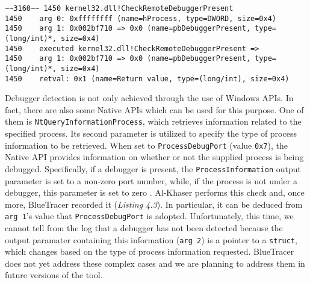 \vspace{0.5cm}
\begin{lstlisting}[caption={Log entry relative to \texttt{CheckRemoteDebuggerPresent}},captionpos=b]
~~3160~~ 1450 kernel32.dll!CheckRemoteDebuggerPresent
1450 	arg 0: 0xffffffff (name=hProcess, type=DWORD, size=0x4)
1450 	arg 1: 0x002bf710 => 0x0 (name=pbDebuggerPresent, type=(long/int)*, size=0x4)
1450    executed kernel32.dll!CheckRemoteDebuggerPresent =>
1450 	arg 1: 0x002bf710 => 0x0 (name=pbDebuggerPresent, type=(long/int)*, size=0x4)
1450 	retval: 0x1 (name=Return value, type=(long/int), size=0x4)
\end{lstlisting}

Debugger detection is not only achieved through the use of Windows APIs. In fact, there are also some Native APIs which can be used for this purpose. One of them is \texttt{NtQueryInformationProcess}, which retrieves information related to the specified process. Its second parameter is utilized to specify the type of process information to be retrieved. When set to \texttt{ProcessDebugPort} (value \texttt{0x7}), the Native API provides information on whether or not the supplied process is being debugged. Specifically, if a debugger is present, the \texttt{ProcessInformation} output parameter is set to a non-zero port number, while, if the process is not under a debugger, this parameter is set to zero \cite{Sikorski:2012:PMA:2181153}. Al-Khaser performs this check and, once more, BlueTracer recorded it (\textit{Listing 4.3}). In particular, it can be deduced from \texttt{arg 1}'s value that \texttt{ProcessDebugPort} is adopted. Unfortunately, this time, we cannot tell from the log that a debugger has not been detected because the output paramater containing this information (\texttt{arg 2}) is a pointer to a \texttt{struct}, which changes based on the type of process information requested. BlueTracer does not yet address these complex cases and we are planning to address them in future versions of the tool.  

